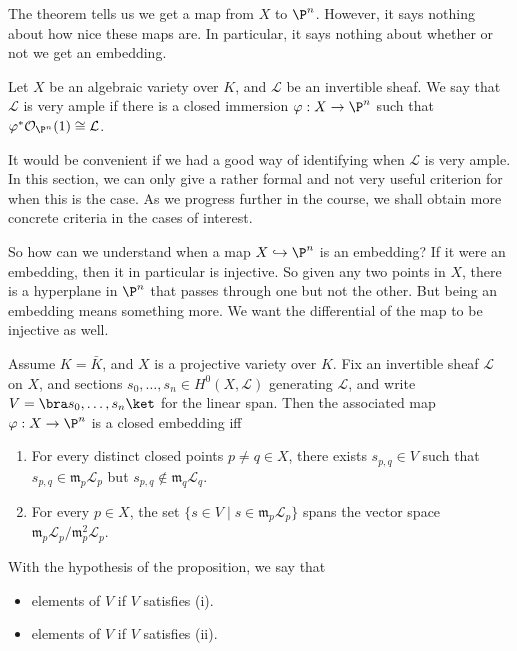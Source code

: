 \documentclass[a4paper]{article}
\begin{document}
The theorem tells us we get a map from $X$ to $\P^n$. However, it says nothing about how nice these maps are. In particular, it says nothing about whether or not we get an embedding.

\begin{defi}
  Let $X$ be an algebraic variety over $K$, and $\mathcal{L}$ be an invertible sheaf. We say that $\mathcal{L}$ is very ample if there is a closed immersion $\varphi: X \to \P^n$ such that $\varphi^* \mathcal{O}_{\P^n}(1) \cong \mathcal{L}$.
\end{defi}
It would be convenient if we had a good way of identifying when $\mathcal{L}$ is very ample. In this section, we can only give a rather formal and not very useful criterion for when this is the case. As we progress further in the course, we shall obtain more concrete criteria in the cases of interest.

So how can we understand when a map $X \hookrightarrow \P^n$ is an embedding? If it were an embedding, then it in particular is injective. So given any two points in $X$, there is a hyperplane in $\P^n$ that passes through one but not the other. But being an embedding means something more. We want the differential of the map to be injective as well.

\begin{prop}
  Assume $K = \bar{K}$, and $X$ is a projective variety over $K$. Fix an invertible sheaf $\mathcal{L}$ on $X$, and sections $s_0, \ldots, s_n \in H^0(X, \mathcal{L})$ generating $\mathcal{L}$, and write $V = \bra s_0, \ldots, s_n\ket$ for the linear span. Then the associated map $\varphi: X \to \P^n$ is a closed embedding iff
  \begin{enumerate}
    \item For every distinct closed points $p \not= q \in X$, there exists $s_{p, q} \in V$ such that $s_{p, q} \in \mathfrak{m}_p \mathcal{L}_p$ but $s_{p, q} \not \in \mathfrak{m}_q \mathcal{L}_q$.
    \item For every $p \in X$, the set $\{s \in V \mid s \in \mathfrak{m}_p \mathcal{L}_p\}$ spans the vector space $\mathfrak{m}_p \mathcal{L}_p /\mathfrak{m}^2_p \mathcal{L}_p$.
  \end{enumerate}
\end{prop}

\begin{defi}
  With the hypothesis of the proposition, we say that
  \begin{itemize}
    \item elements of $V$  if $V$ satisfies (i).
    \item elements of $V$  if $V$ satisfies (ii).
  \end{itemize}
\end{defi}
\end{document}
